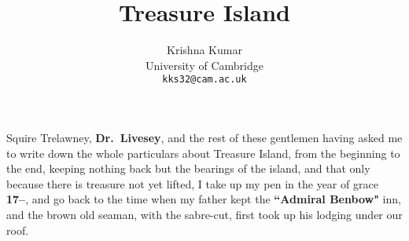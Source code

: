 \documentclass{article}
\title{Treasure Island}
\author{Krishna Kumar\\
	University of Cambridge\\
	\texttt{kks32@cam.ac.uk}}
\begin{document}
\maketitle

Squire Trelawney, \textbf{Dr.~Livesey}, and the rest of these gentlemen having asked me to write down the whole particulars about Treasure Island, from the beginning to the end, keeping nothing back but the bearings of the island, and that only because there is treasure not yet lifted, I take up my pen in the year of grace \textbf{17--}, and go back to the time when my father kept the \textbf{``Admiral Benbow"} inn, and the brown old seaman, with the sabre-cut, first took up his lodging under our roof.
\end{document}
